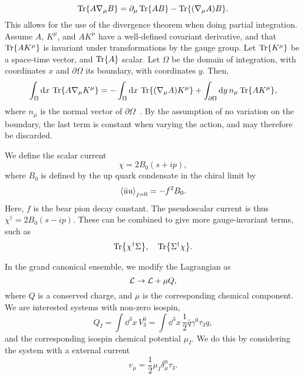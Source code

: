 \begin{equation*}
    \Tr{A \nabla_\mu B} = \partial_\mu \Tr{AB} - \Tr{(\nabla_\mu A) B}.
\end{equation*}
This allows for the use of the divergence theorem when doing partial integration.
Assume $A$, $K^\mu$, and $A K^\mu$ have a well-defined covariant derivative, and that $\Tr{A K^\mu}$ is invariant under transformations by the gauge group.
Let $\Tr{K^\mu}$ be a space-time vector, and $\Tr{A}$ scalar. 
Let $\Omega$ be the domain of integration, with coordinates $x$ and $\partial \Omega$ its boundary, with coordinates $y$. Then, 
\begin{align*}
    \int_\Omega \dd x \, \Tr{A \nabla_\mu K^\mu} 
    = 
    - \int_\Omega \dd x \, \Tr{(\nabla_\mu A) K^\mu}
    + \int_{\partial\Omega} \dd y\, n_\mu \Tr{A K^\mu},
\end{align*}
where $n_\mu$ is the normal vector of $\partial \Omega$~\cite{Carroll:spacetime}.
By the assumption of no variation on the boundary, the last term is constant when varying the action, and may therefore be discarded.

We define the scalar current
\begin{equation}
    \chi = 2 B_0 (s + ip),
\end{equation}
where $B_0$ is defined by the up quark condensate in the chiral limit by
\begin{equation}
    \ex{\bar u u}_{j = 0} = - f^2 B_0.
\end{equation}
Here, $f$ is the bear pion decay constant.
The pseudoscalar current is thus $\chi^\dagger = 2 B_0 (s - ip)$.
These can be combined to give more gauge-invariant terms, such as
\begin{equation}
    \Tr{\chi^\dagger \Sigma}, \quad \Tr{\Sigma^\dagger \chi}.
\end{equation}

In the grand canonical ensemble, we modify the Lagrangian as
\begin{equation}
    \mathcal{L} \rightarrow \mathcal{L} + \mu Q,
\end{equation}
where $Q$ is a conserved charge, and $\mu$ is the corresponding chemical component.
We are interested systems with non-zero isospin, 
\begin{equation}
    Q_I = \int \dd^3 x \, V^0_3 = \int \dd^3 x \, \frac{1}{2}  \bar q \gamma^0 \tau_3 q,
\end{equation}
and the corresponding isospin chemical potential $\mu_I$.
We do this by considering the system with a external current
\begin{equation}
    v_\mu = \frac{1}{2} \mu_I \delta_\mu^0 \tau_3.
\end{equation}

